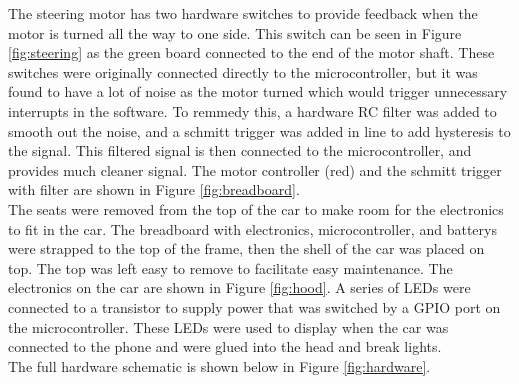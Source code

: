 \documentclass[12pt]{article}
\begin{document}
The steering motor has two hardware switches to provide feedback when the motor is turned all the way to one side. This switch can be seen in Figure \ref{fig:steering} as the green board connected to the end of the motor shaft. These switches were originally connected directly to the microcontroller, but it was found to have a lot of noise as the motor turned which would trigger unnecessary interrupts in the software. To remmedy this, a hardware RC filter was added to smooth out the noise, and a schmitt trigger was added in line to add hysteresis to the signal. This filtered signal is then connected to the microcontroller, and provides much cleaner signal. The motor controller (red) and the schmitt trigger with filter are shown in Figure \ref{fig:breadboard}. \\

The seats were removed from the top of the car to make room for the electronics to fit in the car. The breadboard with electronics, microcontroller, and batterys were strapped to the top of the frame, then the shell of the car was placed on top. The top was left easy to remove to facilitate easy maintenance. The electronics on the car are shown in Figure \ref{fig:hood}. A series of LEDs were connected to a transistor to supply power that was switched by a GPIO port on the microcontroller. These LEDs were used to display when the car was connected to the phone and were glued into the head and break lights. \\

The full hardware schematic is shown below in Figure \ref{fig:hardware}.
\end{document}
